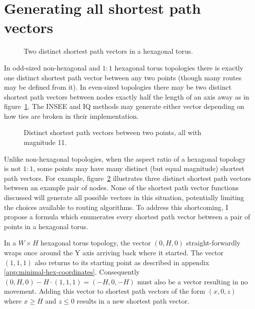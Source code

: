 	\section{Generating all shortest path vectors}
			
			\begin{figure}
				\center
				
				\caption{Two distinct shortest path vectors in a hexagonal torus.}
				\label{fig:wrap-alternatives}
			\end{figure}
			
			In odd-sized non-hexagonal and $1:1$ hexagonal torus topologies there is
			exactly one distinct shortest path vector between any two points (though
			many routes may be defined from it). In even-sized topologies there may
			be two distinct shortest path vectors between nodes exactly half the
			length of an axis away as in figure~\ref{fig:wrap-alternatives}. The
			INSEE and IQ methods may generate either vector depending on how ties are
			broken in their implementation.
			
			\begin{figure}
				\center
				
				\caption[Distinct shortest path vectors in non-square topologies.]%
				{Distinct shortest path vectors between two points, all with
				magnitude 11.}
				\label{fig:spiralling}
			\end{figure}
			
			Unlike non-hexagonal topologies, when the aspect ratio of a hexagonal
			topology is not $1:1$, some points may have many distinct (but equal
			magnitude) shortest path vectors.  For example,
			figure~\ref{fig:spiralling} illustrates three distinct shortest path
			vectors between an example pair of nodes. None of the shortest path vector
			functions discussed will generate all possible vectors in this situation,
			potentially limiting the choices available to routing algorithms.  To
			address this shortcoming, I propose a formula which enumerates every
			shortest path vector between a pair of points in a hexagonal torus.
			
			In a $W \times H$ hexagonal torus topology, the vector $(0, H, 0)$
			straight-forwardly wraps once around the Y axis arriving back where it
			started. The vector $(1,1,1)$ also returns to its starting point as
			described in appendix \ref{app:minimal-hex-coordinates}. Consequently
			$(0,H,0) - H\cdot(1,1,1) = (-H, 0, -H)$ must also be a vector resulting
			in no movement.  Adding this vector to shortest path vectors of the form
			$(x, 0, z)$ where $x\ge H$ and $z\le0$ results in a new shortest path
			vector.
			
